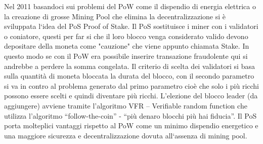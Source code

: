 \documentclass[12pt,titlepage]{report}
\begin{document}
Nel 2011 basandoci sui problemi del PoW come il dispendio di energia elettrica o la creazione di grosse Mining Pool che elimina la decentralizzazione si è sviluppata l`idea del PoS Proof of Stake. Il PoS sostituisce i miner con i validatori o coniatore, questi per far si che il loro blocco venga considerato valido devono depositare della moneta come "cauzione" che viene appunto chiamata Stake. 
In questo modo se con il PoW era possibile inserire transazione fraudolente qui si andrebbe a perdere la somma congelata. Il criterio di scelta dei validatori si basa sulla quantità di moneta bloccata la durata del blocco, con il secondo parametro si va in contro al problema generato dal primo parametro cioè che solo i più ricchi possono essere scelti e quindi diventare più ricchi.
L’elezione del blocco leader (da aggiungere) avviene tramite l’algoritmo VFR – Verifiable random function che utilizza l’algoritmo “follow-the-coin” - “più denaro blocchi più hai fiducia”. Il PoS porta molteplici vantaggi rispetto al PoW come un minimo dispendio energetico e una maggiore sicurezza e decentralizzazione dovuta all`assenza di mining pool.
\end{document}
